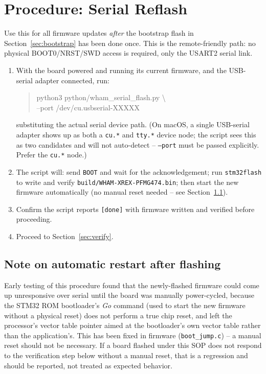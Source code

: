\documentclass[11pt]{article}
\newcommand{\code}[1]{\texttt{#1}}
\begin{document}
\section{Procedure: Serial Reflash}
\label{sec:serial-flash}

Use this for all firmware updates \emph{after} the bootstrap flash in
Section~\ref{sec:bootstrap} has been done once. This is the
remote-friendly path: no physical BOOT0\slash NRST\slash SWD access is
required, only the USART2 serial link.

\begin{enumerate}[label=\arabic*.]
  \item With the board powered and running its current firmware, and the
    USB-serial adapter connected, run:
\begin{quote}\ttfamily\small\raggedright
python3 python/wham\_serial\_flash.py \textbackslash\\
\hspace*{1em}--port /dev/cu.usbserial-XXXXX
\end{quote}
    substituting the actual serial device path. (On macOS, a single
    USB-serial adapter shows up as both a \code{cu.*} and \code{tty.*}
    device node; the script sees this as two candidates and will not
    auto-detect -- \code{--port} must be passed explicitly. Prefer the
    \code{cu.*} node.)
  \item The script will: send \code{BOOT} and wait for the
    acknowledgement; run \code{stm32flash} to write and verify
    \code{build/WHAM-XREX-PFMG474.bin}; then start the new firmware
    automatically (no manual reset needed -- see
    Section~\ref{sec:reset-note}).
  \item Confirm the script reports \texttt{[done]} with firmware
    written and verified before proceeding.
  \item Proceed to Section~\ref{sec:verify}.
\end{enumerate}

\subsection{Note on automatic restart after flashing}
\label{sec:reset-note}

Early testing of this procedure found that the newly-flashed firmware
could come up unresponsive over serial until the board was manually
power-cycled, because the STM32 ROM bootloader's \emph{Go} command (used
to start the new firmware without a physical reset) does not perform a
true chip reset, and left the processor's vector table pointer aimed at
the bootloader's own vector table rather than the application's. This
has been fixed in firmware (\code{boot\_jump.c}) -- a manual reset should
not be necessary. If a board flashed under this SOP does not respond to
the verification step below without a manual reset, that is a
regression and should be reported, not treated as expected behavior.
\end{document}
